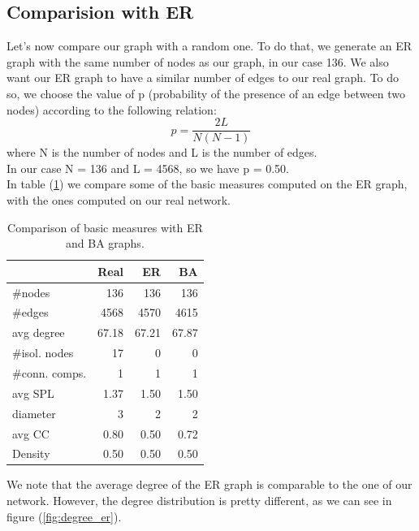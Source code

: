 \subsection{Comparision with ER}
Let's now compare our graph with a random one.
To do that, we generate an ER graph with the same number of nodes as our graph, in our case 136. We also want our ER graph to have a similar number of edges to our real graph. To do so, we choose the value of p (probability of the presence of an edge between two nodes) according to the following relation:
\begin{equation}
    p = \dfrac{2 L}{N(N-1)}
\end{equation}
where N is the number of nodes and L is the number of edges.\\
In our case N = 136 and L = 4568, so we have p = 0.50. \\
In table (\ref{tab:er_ba}) we compare some of the basic measures computed on the ER graph, with the ones computed on our real network.
\begin{table}[h]
\begin{tabular}{lrrr}
\hline
               &    Real &      ER &      BA \\
\hline
 \#nodes        &  136 &  136 &  136 \\
 \#edges        & 4568  & 4570 & 4615 \\
 avg degree    &   67.18 &   67.21 &   67.87 \\
 \#isol. nodes  &   17 &    0 &    0 \\
 \#conn. comps. &    1 &    1 &    1 \\
 avg SPL       &    1.37 &    1.50 &    1.50 \\
 diameter      &    3 &    2 &    2 \\
 avg CC        &    0.80 &    0.50 &    0.72 \\
 Density       &    0.50 &    0.50 &    0.50 \\
\hline
\end{tabular}
\caption{Comparison of basic measures with ER and BA graphs.}
\label{tab:er_ba}
\end{table}

We note that the average degree of the ER graph is comparable to the one of our network. However, the degree distribution is pretty different, as we can see in figure (\ref{fig:degree_er}).

